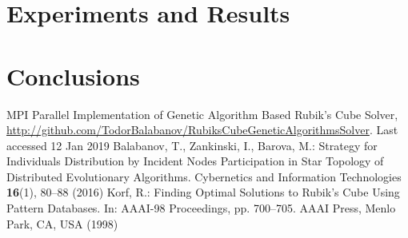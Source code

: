 \documentclass[runningheads]{llncs}
\begin{document}
\section{Experiments and Results}

\section{Conclusions}

\begin{thebibliography}{8}
MPI Parallel Implementation of Genetic Algorithm Based Rubik’s Cube Solver, \url{http://github.com/TodorBalabanov/RubiksCubeGeneticAlgorithmsSolver}. Last accessed 12 Jan 2019
Balabanov, T., Zankinski, I., Barova, M.: Strategy for Individuals Distribution by Incident Nodes Participation in Star Topology of Distributed Evolutionary Algorithms. Cybernetics and Information Technologies \textbf{16}(1), 80--88 (2016)
Korf, R.: Finding Optimal Solutions to Rubik’s Cube Using Pattern Databases. In: AAAI-98 Proceedings, pp. 700--705. AAAI Press, Menlo Park, CA, USA (1998)
\end{thebibliography}
\end{document}
